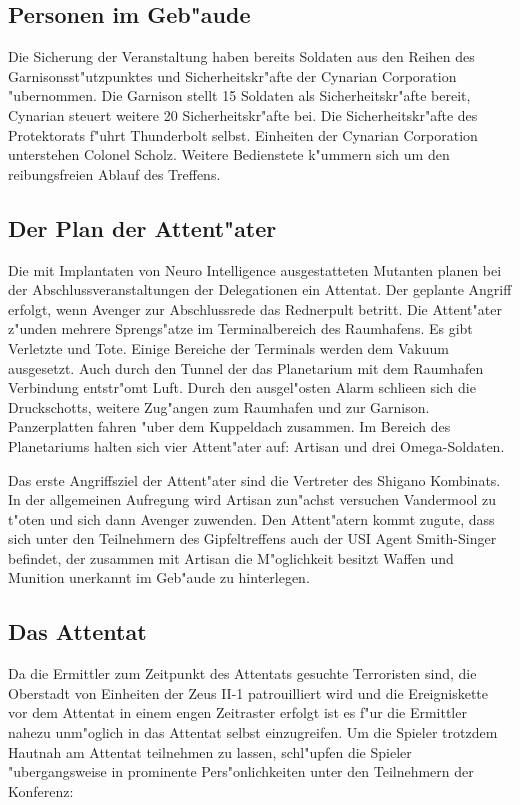 \subsection{Personen im Geb"aude} 
Die Sicherung der Veranstaltung haben bereits Soldaten aus den Reihen des Garnisonsst"utzpunktes und Sicherheitskr"afte der Cynarian Corporation "ubernommen. Die Garnison stellt 15 Soldaten als Sicherheitskr"afte bereit, Cynarian steuert weitere 20 Sicherheitskr"afte bei. Die Sicherheitskr"afte des Protektorats f"uhrt Thunderbolt selbst. Einheiten der Cynarian Corporation unterstehen Colonel Scholz. Weitere Bedienstete k"ummern sich um den reibungsfreien Ablauf des Treffens.

\subsection{Der Plan der Attent"ater} 
Die mit Implantaten von Neuro Intelligence ausgestatteten Mutanten planen bei der Abschlussveranstaltungen der Delegationen ein Attentat. 
Der geplante Angriff erfolgt, wenn Avenger zur Abschlussrede das Rednerpult betritt. Die Attent"ater z"unden mehrere Sprengs"atze im Terminalbereich des Raumhafens. Es gibt Verletzte und Tote. Einige Bereiche der Terminals werden dem Vakuum ausgesetzt. Auch durch den  Tunnel der das Planetarium mit dem Raumhafen Verbindung entstr"omt Luft. Durch den ausgel"osten Alarm schlie\3en sich die Druckschotts, weitere Zug"angen zum Raumhafen und zur Garnison. Panzerplatten fahren "uber dem Kuppeldach zusammen. Im Bereich des Planetariums halten sich vier Attent"ater auf: Artisan und drei Omega-Soldaten.

Das erste Angriffsziel der Attent"ater sind die Vertreter des Shigano Kombinats. In der allgemeinen Aufregung wird Artisan zun"achst versuchen Vandermool zu t"oten und sich dann Avenger zuwenden. Den Attent"atern kommt zugute, dass sich unter den Teilnehmern des Gipfeltreffens auch der USI Agent Smith-Singer befindet, der zusammen mit Artisan die M"oglichkeit besitzt Waffen und Munition unerkannt im Geb"aude zu hinterlegen.

\subsection{Das Attentat} 
Da die Ermittler zum Zeitpunkt des Attentats gesuchte Terroristen sind, die Oberstadt von Einheiten der Zeus II-1 patrouilliert wird und die Ereigniskette vor dem Attentat in einem engen Zeitraster erfolgt ist es f"ur die Ermittler nahezu unm"oglich in das Attentat selbst einzugreifen. Um die Spieler trotzdem Hautnah am Attentat teilnehmen zu lassen, schl"upfen die Spieler "ubergangsweise in prominente Pers"onlichkeiten unter den Teilnehmern der Konferenz:

